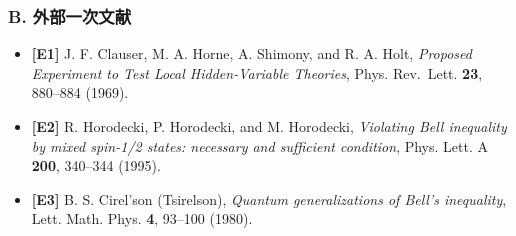 \documentclass[
  a4paper,
]{ltjsarticle}
\providecommand{\tightlist}{%
  \setlength{\itemsep}{0pt}\setlength{\parskip}{0pt}}
\begin{document}
\subsubsection{B.
外部一次文献}\label{b.-ux5916ux90e8ux4e00ux6b21ux6587ux732e}

\begin{itemize}
\tightlist
\item
  \textbf{{[}E1{]}} J. F. Clauser, M. A. Horne, A. Shimony, and R. A.
  Holt, \emph{Proposed Experiment to Test Local Hidden-Variable
  Theories}, Phys. Rev.~Lett. \textbf{23}, 880--884 (1969).
\item
  \textbf{{[}E2{]}} R. Horodecki, P. Horodecki, and M. Horodecki,
  \emph{Violating Bell inequality by mixed spin-1/2 states: necessary
  and sufficient condition}, Phys. Lett. A \textbf{200}, 340--344
  (1995).
\item
  \textbf{{[}E3{]}} B. S. Cirel'son (Tsirelson), \emph{Quantum
  generalizations of Bell's inequality}, Lett. Math. Phys. \textbf{4},
  93--100 (1980).
\end{itemize}
\end{document}
